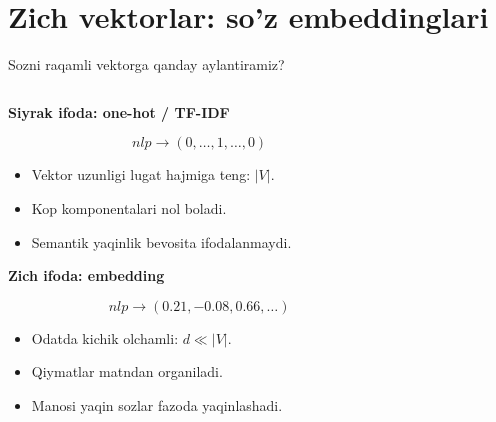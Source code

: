 \documentclass[aspectratio=169,11pt]{beamer}
\begin{document}
\section[Embeddinglar]{Zich vektorlar: so'z embeddinglari}

\begin{frame}{So\textquotesingle{}zni raqamli vektorga qanday aylantiramiz?}
\footnotesize

\begin{columns}[T,totalwidth=\textwidth]
\begin{column}{0.50\textwidth}

\textbf{Siyrak ifoda: one-hot / TF-IDF}

\vspace{2pt}
\[
\textit{nlp}\rightarrow (0,\ldots,1,\ldots,0)
\]

\begin{itemize}\setlength\itemsep{3pt}
    \item Vektor uzunligi lug\textquotesingle{}at hajmiga teng: $|V|$.
    \item Ko\textquotesingle{}p komponentalari nol bo\textquotesingle{}ladi.
    \item Semantik yaqinlik bevosita ifodalanmaydi.
\end{itemize}

\vspace{4pt}

\textbf{Zich ifoda: embedding}

\vspace{2pt}
\[
\textit{nlp}\rightarrow (0.21,-0.08,0.66,\ldots)
\]

\begin{itemize}\setlength\itemsep{3pt}
    \item Odatda kichik o\textquotesingle{}lchamli: $d \ll |V|$.
    \item Qiymatlar matndan o\textquotesingle{}rganiladi.
    \item Ma\textquotesingle{}nosi yaqin so\textquotesingle{}zlar fazoda yaqinlashadi.
\end{itemize}

\end{column}
\begin{column}{0.46\textwidth}


\end{column}
\end{columns}
\end{frame}
\end{document}

